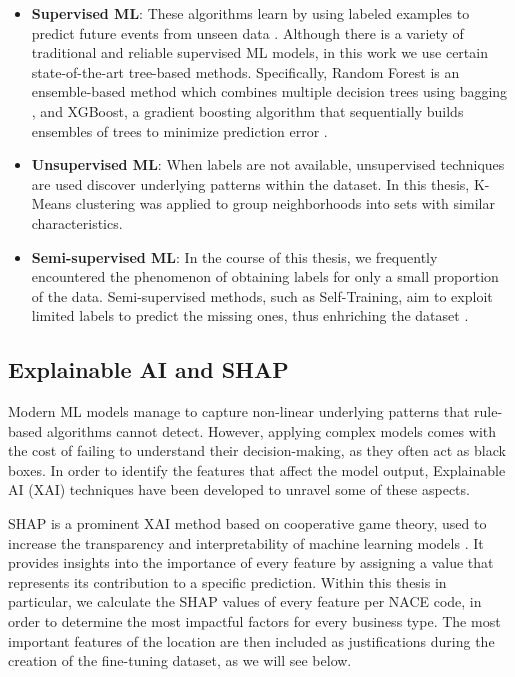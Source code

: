 \begin{itemize}
    \item \textbf{Supervised ML}: These algorithms learn by using labeled examples to predict future events from unseen data \cite{megacities_paper}. Although there is a variety of traditional and reliable supervised ML models, in this work we use certain state-of-the-art tree-based methods. Specifically, Random Forest is an ensemble-based method which combines multiple decision trees using bagging \cite{random_forest_breiman2001}, and XGBoost, a gradient boosting algorithm that sequentially builds ensembles of trees to minimize prediction error \cite{xgboost_chen2016}.

    \item \textbf{Unsupervised ML}: When labels are not available, unsupervised techniques are used discover underlying patterns within the dataset. In this thesis, K-Means clustering \cite{Kmeans_Ikotun2023} was applied to group neighborhoods into sets with similar characteristics. 

    \item \textbf{Semi-supervised ML}: In the course of this thesis, we frequently encountered the phenomenon of obtaining labels for only a small proportion of the data. Semi-supervised methods, such as Self-Training, aim to exploit limited labels to predict the missing ones, thus enhriching the dataset \cite{Rosidi2024SemiSupervised}.
\end{itemize}



\subsection{Explainable AI and SHAP}

Modern ML models manage to capture non-linear underlying patterns that rule-based algorithms cannot detect. However, applying complex models comes with the cost of failing to understand their decision-making, as they often act as black boxes. In order to identify the features that affect the model output, Explainable AI (XAI) techniques have been developed to unravel some of these aspects.

SHAP is a prominent XAI method based on cooperative game theory, used to increase the transparency and interpretability of machine learning models \cite{SHAP_Trevisan2022}. It provides insights into the importance of every feature by assigning a value that represents its contribution to a specific prediction. Within this thesis in particular, we calculate the SHAP values of every feature per NACE code, in order to determine the most impactful factors for every business type. The most important features of the location are then included as justifications during the creation of the fine-tuning dataset, as we will see below. 
 

